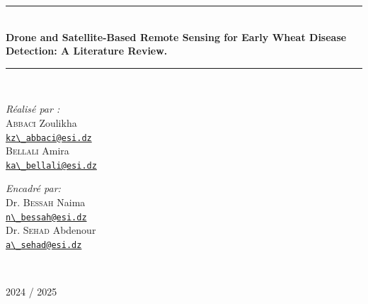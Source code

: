 {\begin{titlepage}
    \rule{\linewidth}{0.3mm} \\[0.4cm]
    {
    \Large \bfseries
    Drone and Satellite-Based Remote Sensing for Early Wheat Disease Detection: A Literature Review.\\
    }
    \rule{\linewidth}{0.3mm} \\[1cm]

    \vspace{10mm}

    \noindent
    \begin{minipage}{0.6\textwidth}
      \vspace{-7mm}
      \begin{flushleft} \large
        \emph{Réalisé par :}\\
        \textsc{Abbaci} Zoulikha \\
        \href{mailto:kz_abbaci@esi.dz}{\verb!kz\_abbaci@esi.dz!} \\[0.3cm]
        \textsc{Bellali} Amira \\
        \href{mailto:ka_bellali@esi.dz}{\verb!ka\_bellali@esi.dz!}
      \end{flushleft}
    \end{minipage}
    \begin{minipage}{0.35\textwidth}
      \begin{flushright} \large
        \begin{flushleft} \large
          \emph{Encadré par:} \\
          Dr. \textsc{Bessah} Naima\\
          \href{mailto:n_bessah@esi.dz}{\verb!n\_bessah@esi.dz!}\\[0.3cm]
          Dr. \textsc{Sehad} Abdenour\\
          \href{mailto:a_sehad@esi.dz}{\verb!a\_sehad@esi.dz!}
        \end{flushleft}
      \end{flushright}
    \end{minipage}\\[1cm]


    \vfill

    {\large 2024 / 2025}
  \end{titlepage}
  \restoregeometry
}
